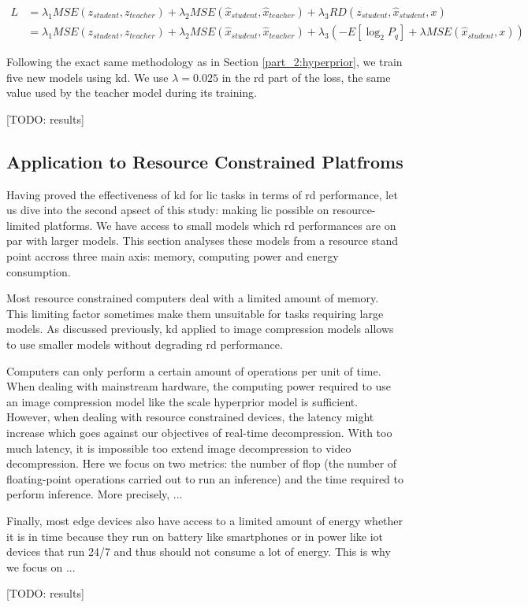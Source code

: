 \begin{align}
    L &= \lambda_{1} MSE(z_{student}, z_{teacher}) + \lambda_{2} MSE(\hat{x}_{student}, \hat{x}_{teacher}) + \lambda_{3} RD(z_{student}, \hat{x}_{student}, x)\\
      &= \lambda_{1} MSE(z_{student}, z_{teacher}) + \lambda_{2} MSE(\hat{x}_{student}, \hat{x}_{teacher}) + \lambda_{3} (-E[\log_{2}P_{q}] + \lambda MSE(\hat{x}_{student}, x)) \nonumber
\end{align}

Following the exact same methodology as in Section \ref{part_2:hyperprior}, we train five new models using \acrshort{kd}. We use \(\lambda = 0.025\) in the \acrshort{rd} part of the loss, the same value used by the teacher model during its training.

[TODO: results] %

\subsection{Application to Resource Constrained Platfroms}
Having proved the effectiveness of \acrshort{kd} for \acrshort{lic} tasks in terms of \acrshort{rd} performance, let us dive into the second apsect of this study: making \acrshort{lic} possible on resource-limited platforms. We have access to small models which \acrshort{rd} performances are on par with larger models. This section analyses these models from a resource stand point accross three main axis: memory, computing power and energy consumption.

Most resource constrained computers deal with a limited amount of memory. This limiting factor sometimes make them unsuitable for tasks requiring large models. As discussed previously, \acrshort{kd} applied to image compression models allows to use smaller models without degrading \acrshort{rd} performance. %

Computers can only perform a certain amount of operations per unit of time. When dealing with mainstream hardware, the computing power required to use an image compression model like the scale hyperprior model is sufficient. However, when dealing with resource constrained devices, the latency might increase which goes against our objectives of real-time decompression. With too much latency, it is impossible too extend image decompression to video decompression. Here we focus on two metrics: the number of \acrfull{flop} (the number of floating-point operations carried out to run an inference) and the time required to perform inference. More precisely, ... %

Finally, most edge devices also have access to a limited amount of energy whether it is in time because they run on battery like smartphones or in power like \acrshort{iot} devices that run 24/7 and thus should not consume a lot of energy. This is why we focus on ... %


[TODO: results] %